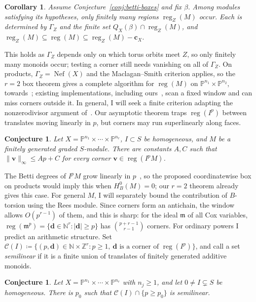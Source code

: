\documentclass[11pt,reqno]{amsart}
\newtheorem{cor}[lemma]{Corollary}
\newtheorem{conjecture}[lemma]{Conjecture}
\theoremstyle{remark}
\newcommand{\reg}{\operatorname{reg}}
\newcommand{\Nef}{\operatorname{Nef}}
\newcommand{\dd}{\mathbf{d}}
\newcommand{\vv}{\mathbf{v}}
\newcommand{\NN}{\mathbb{N}}
\newcommand{\PP}{\mathbb{P}}
\newcommand{\ZZ}{\mathbb{Z}}
\newcommand{\cC}{\mathcal{C}}
\begin{document}
\begin{cor}\label{cor:finite-regularity-test}
Assume Conjecture~\ref{conj:betti-boxes} and fix $\beta$. Among modules satisfying its hypotheses, only finitely many regions $\reg_Z(M)$ occur. Each is determined by $\Gamma_Z$ and the finite set $Q_X(\beta)\cap\reg_Z(M)$, and $\reg_Z(M)\subseteq\reg(M)\subseteq\reg_Z(M)-\mathbf c_X$.
\end{cor}

This holds as $\Gamma_Z$ depends only on which torus orbits meet $Z$, so only finitely many monoids occur; testing a corner still needs vanishing on all of $\Gamma_Z$. On products, $\Gamma_Z=\Nef(X)$ and the Maclagan--Smith criterion applies, so the $r=2$ box theorem gives a complete algorithm for $\reg(M)$ on $\PP^{n_1}\times\PP^{n_2}$, towards~\cite[Prob.~4.10]{maclaganSmith04}; existing implementations, including ours~\cite{ABLS20}, scan a fixed window and can miss corners outside it. In general, I will seek a finite criterion adapting the nonzerodivisor argument of~\cite[Cor.~4.8]{maclaganSmith04}. Our asymptotic theorem traps $\reg(I^p)$ between translates moving linearly in $p$, but corners may run superlinearly along faces.

\begin{conjecture}\label{conj:linear-windows-powers}
Let $X=\PP^{n_1}\times\cdots\times\PP^{n_r}$, $I\subset S$ be homogeneous, and $M$ be a finitely generated graded $S$-module. There are constants $A,C$ such that $\|\vv\|_\infty\le Ap+C$ for every corner $\vv\in\reg(I^pM)$.
\end{conjecture}

The Betti degrees of $I^pM$ grow linearly in $p$~\cite[Thm.~1.1]{BCHT13}, so the proposed coordinatewise box on products would imply this when $H_B^0(M)=0$; our $r=2$ theorem already gives this case. For general $M$, I will separately bound the contribution of $B$-torsion using the Rees module. Since corners form an antichain, the window allows $O(p^{r-1})$ of them, and this is sharp: for the ideal $\mathfrak m$ of all Cox variables, $\reg(\mathfrak m^p)=\{\dd\in\NN^r:|\dd|\ge p\}$ has $\binom{p+r-1}{r-1}$ corners. For ordinary powers I predict an arithmetic structure. Set $\cC(I)\coloneqq\{(p,\dd)\in\NN\times\ZZ^r : p\geq1,\ \dd\text{ is a corner of }\reg(I^p)\}$, and call a set \emph{semilinear} if it is a finite union of translates of finitely generated additive monoids.

\begin{conjecture}\label{conj:semilinear-corners}
Let $X=\PP^{n_1}\times\cdots\times\PP^{n_r}$ with $n_j\geq1$, and let $0\neq I\subsetneq S$ be homogeneous. There is $p_0$ such that $\cC(I)\cap\{p\geq p_0\}$ is semilinear.
\end{conjecture}
\end{document}
